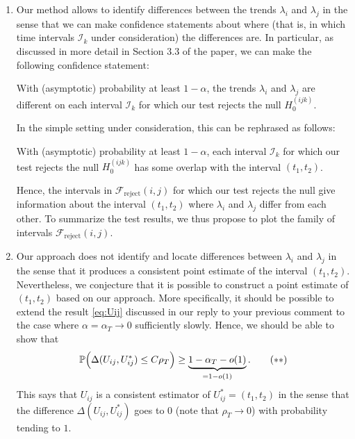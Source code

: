 \documentclass[a4paper,12pt]{article}
\begin{document}
\begin{enumerate}[label=(\arabic*),leftmargin=0.7cm]
\begin{enumerate}[label=(\roman*), leftmargin=0.8cm]
\item Our method allows to identify differences between the trends $\lambda_i$ and $\lambda_j$ in the sense that we can make confidence statements about where (that is, in which time intervals $\mathcal{I}_k$ under consideration) the differences are. In particular, as discussed in more detail in Section 3.3 of the paper, we can make the following confidence statement: 
\vspace{0.1cm}

\begin{center}
\begin{minipage}{0.8\textwidth}
With (asymptotic) probability at least $1-\alpha$, the trends $\lambda_i$ and $\lambda_j$ are different on each interval $\mathcal{I}_k$ for which our test rejects the null $H_0^{(ijk)}$.
\end{minipage}
\end{center} 
\vspace{0.1cm}

In the simple setting under consideration, this can be rephrased as follows:
\vspace{0.1cm}

\begin{center}
\begin{minipage}{0.8\textwidth}
With (asymptotic) probability at least $1-\alpha$, each interval $\mathcal{I}_k$ for which our test rejects the null $H_0^{(ijk)}$ has some overlap with the interval $(t_1,t_2)$.
\end{minipage}
\end{center}
\vspace{0.1cm}

Hence, the intervals in $\mathcal{F}_{\text{reject}}(i,j)$ for which our test rejects the null give information about the interval $(t_1,t_2)$ where $\lambda_i$ and $\lambda_j$ differ from each other. To summarize the test results, we thus propose to plot the family of intervals $\mathcal{F}_{\text{reject}}(i,j)$. 

\item Our approach does not identify and locate differences between $\lambda_i$ and $\lambda_j$ in the sense that it produces a consistent point estimate of the interval $(t_1,t_2)$. Nevertheless, we conjecture that it is possible to construct a point estimate of $(t_1,t_2)$ based on our approach. More specifically, it should be possible to extend the result \eqref{eq:Uij} discussed in our reply to your previous comment to the case where $\alpha = \alpha_T \to 0$ sufficiently slowly. Hence, we should be able to show that 
\begin{equation}\label{eq:Uij-conjecture}
\mathbb{P} \Big( \Delta(U_{ij}, U_{ij}^*) \le C \rho_T \Big) \ge \underbrace{1-\alpha_T - o(1)}_{= 1 - o(1)}. \tag{$**$}
\end{equation}
This says that $U_{ij}$ is a consistent estimator of $U_{ij}^* = (t_1,t_2)$ in the sense that the difference $\Delta(U_{ij}, U_{ij}^*)$ goes to $0$ (note that $\rho_T \to 0$) with probability tending to $1$. 


\end{enumerate}
\end{enumerate}
\end{document}
